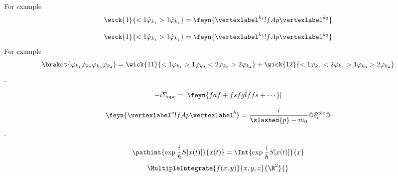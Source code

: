 \begin{pabox}
   For example%
   \begin{dmath}[compact]
   \wick{1}{<1 \hat{\varphi}_{k_{1}} >1\hat{\varphi}_{k_{2}} }=
   \feyn{\vertexlabel^{k_{1}} !{fA}p \vertexlabel^{k_{2}}}
   \end{dmath}
\end{pabox}
\begin{dmath}[compact]
   \wick{1}{<1 \hat{\varphi}_{k_{1}} >1\hat{\varphi}_{k_{2}} }=
   \feyn{\vertexlabel^{k_{1}} !{fA}p \vertexlabel^{k_{2}}}
\end{dmath}
For example
\begin{dmath}
   \braket{\varphi_{k_{1}}\varphi_{k_{2}}\varphi_{k_{3}} \varphi_{k_{4}}}
   = 
   \wick{11}{<1 \varphi_{k_{1}} >1\varphi_{k_{2}} <2 \varphi_{k_{3}} >2
      \varphi_{k_{4}}}
   +
   \wick{12}{<1 \varphi_{k_{1}} <2\varphi_{k_{2}} >1 \varphi_{k_{3}} >2
      \varphi_{k_{4}}}
\end{dmath}.

\begin{dmath}
   -i\Sigma_{\text{ope}} = \left[ \feyn{faf + fsfglffs + \cdots}\right]
\end{dmath}

\begin{dmath}
   \feyn{\vertexlabel^{a} !{fA}p \vertexlabel^{b}} = \frac{ i}
   {\slashed{p} -m_{0}}
   @\delta^{abc}_{c}@ 
\end{dmath}.

\begin{dmath}
   \pathint{\exp{\frac{i}{\hslash}S[x(t)]}}{x(t)} = 
   \Int{\exp{\frac{i}{\hslash}S[x(t)]}}{x}
\end{dmath}
\begin{dmath}
   \MultipleIntegrate{f(x,y)}{x,y,z}{\R^{2}}{}
\end{dmath}
